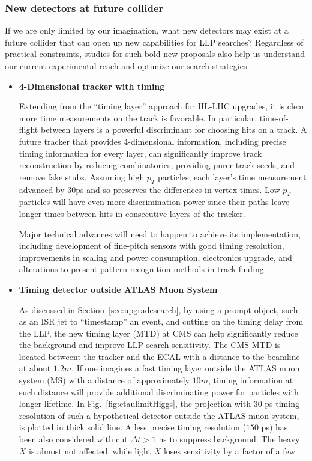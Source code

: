 \subsubsection{New detectors at future collider}

If we are only limited by our imagination, what new detectors may exist at a future collider that can open up new capabilities for LLP searches? 
Regardless of practical constraints, studies for such bold new proposals also help us understand our current experimental reach and optimize our search strategies. 

\begin{itemize}
\item \textbf{4-Dimensional tracker with timing} 

Extending from the “timing layer” approach for HL-LHC upgrades, it is clear more time measurements on the track is favorable. 
In particular, time-of-flight between layers is a powerful discriminant for choosing hits on a track.
A future tracker that provides 4-dimensional information, including precise timing information for every layer, can significantly improve track reconstruction by reducing combinatorics, providing purer track seeds, and remove fake stubs. 
Assuming high $p_T$ particles, each layer’s time measurement advanced by 30ps and so preserves the differences in vertex times.
Low $p_T$ particles will have even more discrimination power since their paths leave longer times between hits in consecutive layers of the tracker. 

Major technical advances will need to happen to achieve its implementation, including development of fine-pitch sensors with good timing resolution, improvements in scaling and power consumption, electronics upgrade, and alterations to present pattern recognition methods in track finding. 

\item \textbf{Timing detector outside ATLAS Muon System}

As discussed in Section~\ref{sec:upgradesearch}, by using a prompt object, such as an ISR jet to ``timestamp'' an event, and cutting on the timing delay from the LLP, the new timing layer (MTD) at CMS can help significantly reduce the background and improve LLP search sensitivity. 
The CMS MTD is located betweent the tracker and the ECAL with a distance to the beamline at about $1.2m$. 
If one imagines a fast timing layer outside the ATLAS muon system (MS) with a distance of approximately $10m$, timing information at such distance will provide additional discriminating power for particles with longer lifetime. 
In Fig.~\ref{fig:ctaulimitHiggs}, the projection with $30$ ps timing resolution of such a hypothetical detector outside the ATLAS muon system, is plotted in thick solid line. 
A less precise timing resolution 
($150$ ps) has been also considered with cut $\Delta t > 1$ ns to suppress background.
The heavy $X$ is almost not affected, while light $X$ loses sensitivity by a factor of a few.


\end{itemize}
